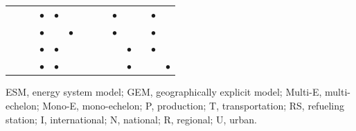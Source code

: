 \documentclass[11pt,3p]{elsarticle}
\begin{document}
\begin{table}[!htbp]
{\begin{tabular}{lccccccccccccc}
\citet{hwangbo2017mathematical} &  &  & $\bullet$ & $\bullet$ &  &  &  &  & $\bullet$ &  &  & $\bullet$ &  \\
\citet{ingason2008optimizing} &  &  & $\bullet$ &  & $\bullet$ &  &  &  & $\bullet$ &  &  & $\bullet$ &  \\
\citet{johnson2012spatially} &  &  & $\bullet$ & $\bullet$ &  &  &  &  &  & $\bullet$ &  & $\bullet$ &  \\
\citet{johnson2005optimal} &  &  & $\bullet$ & $\bullet$ &  &  &  &  &  & $\bullet$ &  &  & $\bullet$ \\ \hline
\end{tabular}
}
\begin{tablenotes}
\small
\item ESM, energy system model; GEM, geographically explicit model; Multi-E, multi-echelon; Mono-E, mono-echelon; P, production; T, transportation; RS, refueling station; I, international; N, national; R, regional; U, urban.
\end{tablenotes}
\end{table}
\end{document}
